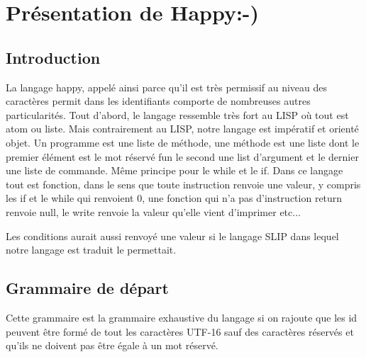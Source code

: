 \chapter{Présentation de Happy:-)}
\section{Introduction}
La langage happy, appelé ainsi parce qu'il est très permissif au niveau des caractères permit dans les identifiants comporte de nombreuses autres particularités. Tout d'abord, le langage ressemble très fort au LISP où tout est atom ou liste.
Mais contrairement au LISP, notre langage est impératif et orienté objet. Un programme est une liste de méthode, une méthode est une liste dont le premier élément est le mot réservé fun le second une list d'argument et le dernier une liste de commande. Même principe pour le while et le if. Dans ce langage tout est fonction, dans le sens que toute instruction renvoie une valeur, y compris les if et le while qui renvoient 0, une fonction qui n'a pas d'instruction return renvoie null, le write renvoie la valeur qu'elle vient d'imprimer etc...



Les conditions aurait aussi renvoyé une valeur si le langage SLIP dans lequel notre langage est traduit le permettait. 

\section{Grammaire de départ}
Cette grammaire est la grammaire exhaustive du langage si on rajoute que les id peuvent être formé de tout les caractères UTF-16 sauf des caractères réservés et qu'ils ne doivent pas être égale à un mot réservé.

